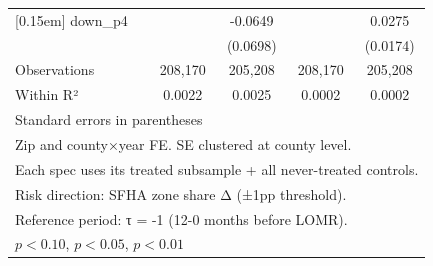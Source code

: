 \begin{table}[htbp]
\begin{tabular}{l*{4}{c}}
[0.15em]
down\_p4             &                     &     -0.0649         &                     &      0.0275         \\
                    &                     &    (0.0698)         &                     &    (0.0174)         \\
\hline
Observations        &     208,170         &     205,208         &     208,170         &     205,208         \\
Within R²           &      0.0022         &      0.0025         &      0.0002         &      0.0002         \\
\hline\hline
\multicolumn{5}{l}{\footnotesize Standard errors in parentheses}\\
\multicolumn{5}{l}{\footnotesize Zip and county×year FE. SE clustered at county level.}\\
\multicolumn{5}{l}{\footnotesize Each spec uses its treated subsample + all never-treated controls.}\\
\multicolumn{5}{l}{\footnotesize Risk direction: SFHA zone share Δ (±1pp threshold).}\\
\multicolumn{5}{l}{\footnotesize Reference period: τ = -1 (12-0 months before LOMR).}\\
\multicolumn{5}{l}{\footnotesize \sym{*} \(p<0.10\), \sym{**} \(p<0.05\), \sym{***} \(p<0.01\)}\\
\end{tabular}
\end{table}
